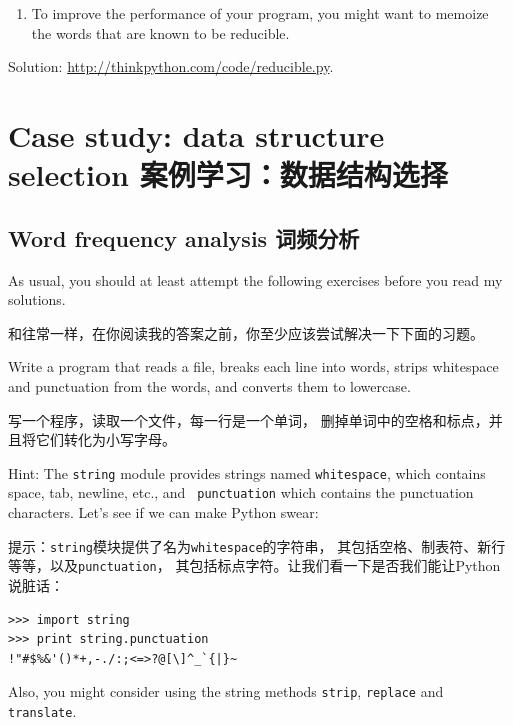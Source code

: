 \documentclass[10pt]{book}
\begin{document}
\begin{CJK}{UTF8}{gbsn}
\begin{exercise}
\begin{enumerate}
\item To improve the performance of your program, you might want
to memoize the words that are known to be reducible.

\end{enumerate}

Solution: \url{http://thinkpython.com/code/reducible.py}.

\end{exercise}








\chapter{Case study: data structure selection 案例学习：数据结构选择}

\section{Word frequency analysis 词频分析}
\label{analysis}

As usual, you should at least attempt the following exercises
before you read my solutions.

和往常一样，在你阅读我的答案之前，你至少应该尝试解决一下下面的习题。

\begin{exercise}

Write a program that reads a file, breaks each line into
words, strips whitespace and punctuation from the words, and
converts them to lowercase.

写一个程序，读取一个文件，每一行是一个单词，
删掉单词中的空格和标点，并且将它们转化为小写字母。

Hint: The {\tt string} module provides strings named {\tt whitespace},
which contains space, tab, newline, etc., and {\tt
  punctuation} which contains the punctuation characters.  Let's see
if we can make Python swear:

提示：{\tt string}模块提供了名为{\tt whitespace}的字符串，
其包括空格、制表符、新行等等，以及{\tt punctuation}，
其包括标点字符。让我们看一下是否我们能让Python说脏话：

\begin{verbatim}
>>> import string
>>> print string.punctuation
!"#$%&'()*+,-./:;<=>?@[\]^_`{|}~
\end{verbatim}
%
Also, you might consider using the string methods {\tt strip},
{\tt replace} and {\tt translate}.


\end{exercise}
\end{CJK}
\end{document}

